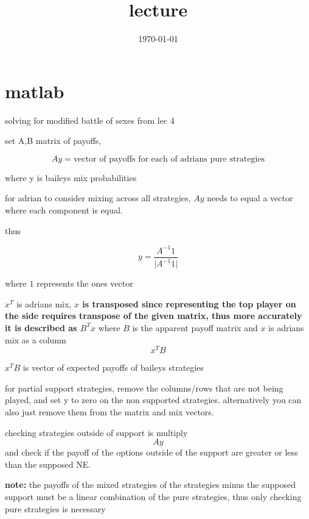 \documentclass{article}
\title{lecture}
\date{\today}
\theoremstyle{definition}
\newcommand{\norm}[1]{\lvert #1 \rvert}
\begin{document}
\maketitle

\section{matlab}

solving for modified battle of sexes from lec 4

set A,B matrix of payoffs,

\begin{equation}
    Ay=\text{vector of payoffs for each of adrians pure strategies}
\end{equation}

where y is baileys mix probabilities


for adrian to consider mixing across all strategies, \(Ay\) needs to equal a vector where each component is equal.

thus

\begin{equation}
    y=\frac{A^{-1} 1}{\norm{A^{-1} 1}}
\end{equation}

where \(1\) represents the ones vector


\(x^T\) is adrians mix, \textbf{\(x\) is transposed since representing the top player on the side requires transpose of the given matrix, thus more accurately it is described as \(B^Tx\)} where \(B\) is the apparent payoff matrix and \(x\) is adrians mix as a column
\begin{equation}
    x^TB
\end{equation}

\(x^TB\) is vector of expected payoffs of baileys strategies


for partial support strategies, remove the columns/rows that are not being played, and set y to zero on the non supported strategies. alternatively you can also just remove them from the matrix and mix vectors.

checking strategies outside of support is multiply 
\begin{equation}
    Ay
\end{equation}
and check if the payoff of the options outside of the support are greater or less than the supposed NE. 

\textbf{note:} the payoffs of the mixed strategies of the strategies minus the supposed support must be a linear combination of the pure strategies, thus only checking pure strategies is necessary
\end{document}
